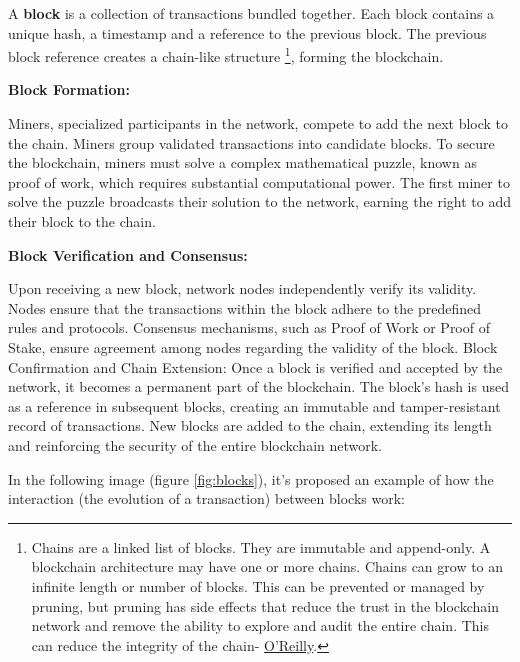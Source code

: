 A \textbf{block} is a collection of transactions bundled together.
Each block contains a unique hash, a timestamp and a reference to the previous block.
The previous block reference creates a chain-like structure \footnote{Chains are a linked list of blocks. They are immutable and append-only. A blockchain architecture may have one or more chains. Chains can grow to an infinite length or number of blocks. This can be prevented or managed by pruning, but pruning has side effects that reduce the trust in the blockchain network and remove the ability to explore and audit the entire chain. This can reduce the integrity of the chain- \href{https://www.oreilly.com/library/view/hands-on-smart-contract/9781492086116/ch01.html}{O'Reilly}.}, forming the blockchain.\newline


\textbf{Block Formation:}\newline

Miners, specialized participants in the network, compete to add the next block to the chain.
Miners group validated transactions into candidate blocks.\newline
To secure the blockchain, miners must solve a complex mathematical puzzle, known as proof of work, which requires substantial computational power.
The first miner to solve the puzzle broadcasts their solution to the network, earning the right to add their block to the chain.\newline

\textbf{Block Verification and Consensus:}\newline

Upon receiving a new block, network nodes independently verify its validity.
Nodes ensure that the transactions within the block adhere to the predefined rules and protocols.
Consensus mechanisms, such as Proof of Work or Proof of Stake, ensure agreement among nodes regarding the validity of the block.
Block Confirmation and Chain Extension:
Once a block is verified and accepted by the network, it becomes a permanent part of the blockchain.
The block's hash is used as a reference in subsequent blocks, creating an immutable and tamper-resistant record of transactions.
New blocks are added to the chain, extending its length and reinforcing the security of the entire blockchain network.\newline

In the following image (figure \ref{fig:blocks}), it's proposed an example of how the interaction (the evolution of a transaction) between blocks work:\newline

